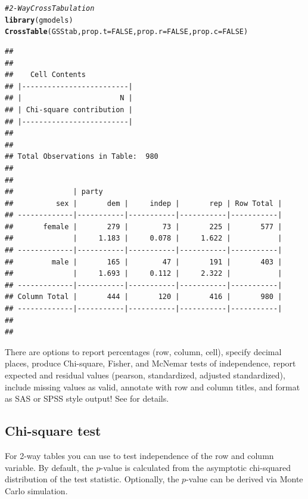 \documentclass[10pt,twoside]{article}\usepackage[]{graphicx}\usepackage[]{color}
\makeatletter
\newcommand{\hlnum}[1]{\textcolor[rgb]{0.686,0.059,0.569}{#1}}%
\newcommand{\hlcom}[1]{\textcolor[rgb]{0.678,0.584,0.686}{\textit{#1}}}%
\newcommand{\hlstd}[1]{\textcolor[rgb]{0.345,0.345,0.345}{#1}}%
\newcommand{\hlkwc}[1]{\textcolor[rgb]{0.333,0.667,0.333}{#1}}%
\newcommand{\hlkwd}[1]{\textcolor[rgb]{0.737,0.353,0.396}{\textbf{#1}}}%
\newenvironment{kframe}{%
 \def\at@end@of@kframe{}%
 \ifinner\ifhmode%
  \def\at@end@of@kframe{\end{minipage}}%
  \begin{minipage}{\columnwidth}%
 \fi\fi%
 \def\FrameCommand##1{\hskip\@totalleftmargin \hskip-\fboxsep
 \colorbox{shadecolor}{##1}\hskip-\fboxsep
     \hskip-\linewidth \hskip-\@totalleftmargin \hskip\columnwidth}%
 \MakeFramed {\advance\hsize-\width
   \@totalleftmargin\z@ \linewidth\hsize
   \@setminipage}}%
 {\par\unskip\endMakeFramed%
 \at@end@of@kframe}
\newenvironment{knitrout}{}{} %
\newcommand{\codefun}[1]{\code{#1()}}
\let\proglang=\textsf
\makeatother
\begin{document}
\begin{knitrout}
\color{fgcolor}\begin{kframe}
\begin{alltt}
\hlcom{# 2-Way Cross Tabulation}
\hlkwd{library}\hlstd{(gmodels)}
\hlkwd{CrossTable}\hlstd{(GSStab,}\hlkwc{prop.t}\hlstd{=}\hlnum{FALSE}\hlstd{,}\hlkwc{prop.r}\hlstd{=}\hlnum{FALSE}\hlstd{,}\hlkwc{prop.c}\hlstd{=}\hlnum{FALSE}\hlstd{)}
\end{alltt}
\begin{verbatim}
## 
##  
##    Cell Contents
## |-------------------------|
## |                       N |
## | Chi-square contribution |
## |-------------------------|
## 
##  
## Total Observations in Table:  980 
## 
##  
##              | party 
##          sex |       dem |     indep |       rep | Row Total | 
## -------------|-----------|-----------|-----------|-----------|
##       female |       279 |        73 |       225 |       577 | 
##              |     1.183 |     0.078 |     1.622 |           | 
## -------------|-----------|-----------|-----------|-----------|
##         male |       165 |        47 |       191 |       403 | 
##              |     1.693 |     0.112 |     2.322 |           | 
## -------------|-----------|-----------|-----------|-----------|
## Column Total |       444 |       120 |       416 |       980 | 
## -------------|-----------|-----------|-----------|-----------|
## 
## 
\end{verbatim}
\end{kframe}
\end{knitrout}

There are  options to  report percentages  (row, column,  cell), specify decimal
places, produce Chi-square,  Fisher, and McNemar  tests of independence,  report
expected  and residual  values (pearson,  standardized, adjusted  standardized),
include missing values as valid, annotate with row and column titles, and format
as \proglang{SAS} or \proglang{SPSS} style output! See  for details.


\subsection{Chi-square test}

For 2-way tables you can use \codefun{chisq.test} to test independence of the row
and column variable. By default,  the $p$-value is calculated from  the asymptotic
chi-squared distribution of the test  statistic. Optionally, the $p$-value can  be
derived via Monte Carlo simulation. 
\end{document}
